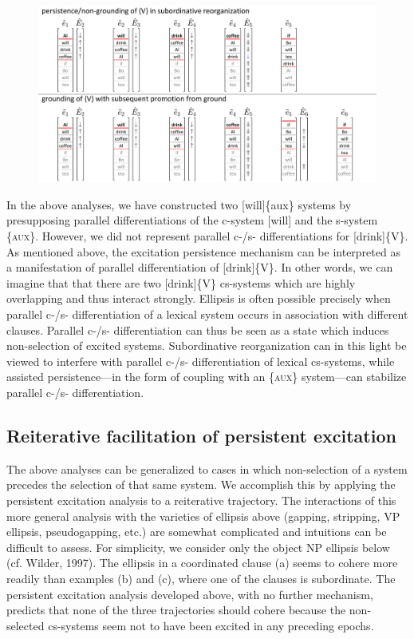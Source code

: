   
\begin{figure}
\includegraphics[width=\textwidth]{figures/Tilsen-img149.png}
\caption{\missingcaption}
\label{fig:}
\end{figure}
 

  In the above analyses, we have constructed two [will]\{aux\} systems by presupposing parallel differentiations of the c-system [will] and the s-system \{\textsc{aux}\}. However, we did not represent parallel c-/s- differentiations for [drink]\{V\}. As mentioned above, the excitation persistence mechanism can be interpreted as a manifestation of parallel differentiation of [drink]\{V\}. In other words, we can imagine that that there are two [drink]\{V\} cs-systems which are highly overlapping and thus interact strongly. Ellipsis is often possible precisely when parallel c-/s- differentiation of a lexical system occurs in association with different clauses. Parallel c-/s- differentiation can thus be seen as a state which induces non-selection of excited systems. Subordinative reorganization can in this light be viewed to interfere with parallel c-/s- differentiation of lexical cs-systems, while assisted persistence—in the form of coupling with an \{\textsc{aux}\} system—can stabilize parallel c-/s- differentiation.

\subsection{Reiterative facilitation of persistent excitation}

The above analyses can be generalized to cases in which non-selection of a system precedes the selection of that same system. We accomplish this by applying the persistent excitation analysis to a reiterative trajectory. The interactions of this more general analysis with the varieties of ellipsis above (gapping, stripping, VP ellipsis, pseudogapping, etc.) are somewhat complicated and intuitions can be difficult to assess. For simplicity, we consider only the object NP ellipsis below (cf. Wilder, 1997). The ellipsis in a coordinated clause (a) seems to cohere more readily than examples (b) and (c), where one of the clauses is subordinate. The persistent excitation analysis developed above, with no further mechanism, predicts that none of the three trajectories should cohere because the non-selected cs-systems seem not to have been excited in any preceding epochs.

